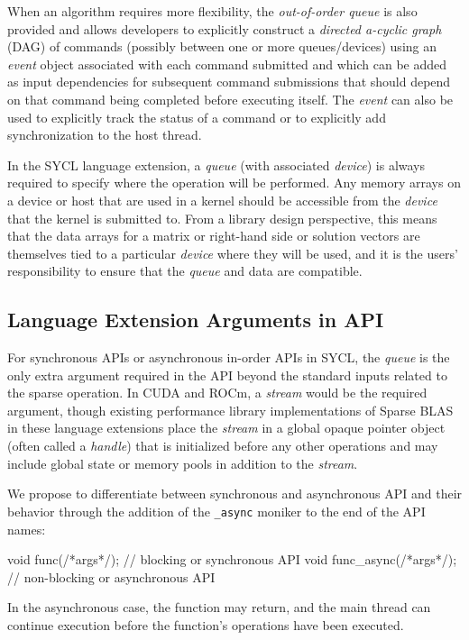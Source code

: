 
When an algorithm requires more flexibility, the \textit{out-of-order queue} is also provided and allows developers to explicitly construct a \textit{directed a-cyclic graph} (DAG) of commands (possibly between one or more queues/devices) using an \textit{event} object associated with each command submitted and which can be added as input dependencies for subsequent command submissions that should depend on that command being completed before executing itself. The \textit{event} can also be used to explicitly track the status of a command or to explicitly add synchronization to the host thread. 

In the SYCL language extension, a \textit{queue} (with associated \textit{device}) is always required to specify where the operation will be performed. Any memory arrays on a device or host that are used in a kernel should be accessible from the \textit{device} that the kernel is submitted to. From a library design perspective, this means that the data arrays for a matrix or right-hand side or solution vectors are themselves tied to a particular \textit{device} where they will be used, and it is the users' responsibility to ensure that the \textit{queue} and data are compatible. 

\subsection{Language Extension Arguments in API}

For synchronous APIs or asynchronous in-order APIs in SYCL, the \textit{queue} is the only extra argument required in the API beyond the standard inputs related to the sparse operation. In CUDA and ROCm, a \textit{stream} would be the required argument, though existing performance library implementations of Sparse BLAS in these language extensions place the \textit{stream} in a global opaque pointer object (often called a \textit{handle}) that is initialized before any other operations and may include global state or memory pools in addition to the \textit{stream}.

We propose to differentiate between synchronous and asynchronous API and their behavior through the addition of the \verb|_async| moniker to the end of the API names:
\begin{lstlistings}
void func(/*args*/);       // blocking or synchronous API
void func_async(/*args*/); // non-blocking or asynchronous API
\end{lstlistings}
In the asynchronous case, the function may return, and the main thread can continue execution before the function's operations have been executed. 


